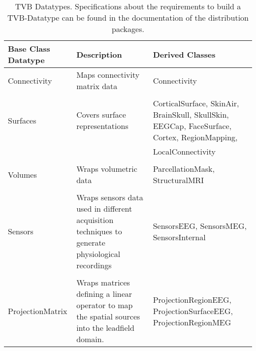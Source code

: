 \documentclass{bioinfo}
\begin{document}
\begin{methods}
\begin{center}     \begin{table*}[ht]\tiny     \label{tab:tvb_datatypes}
\caption{TVB Datatypes. Specifications about the requirements to build a
TVB-Datatype can be found in the documentation of the distribution packages.}
\begin{tabularx}{\textwidth}{lll}             \toprule             Base Class
Datatype & Description                   & Derived Classes \\
\midrule             Connectivity        & Maps connectivity matrix data     &
Connectivity\\             \\             Surfaces            & Covers surface
representations    &   CorticalSurface,
SkinAir,
BrainSkull,
SkullSkin,
EEGCap,
FaceSurface,
Cortex,
RegionMapping, \\
&&  LocalConnectivity\\             \\
Volumes             & Wraps volumetric data            & ParcellationMask,
StructuralMRI \\             \\
Sensors              & Wraps sensors data used in different acquisition
techniques to generate physiological recordings
& SensorsEEG, SensorsMEG, SensorsInternal\\             \\
ProjectionMatrix    & Wraps matrices defining a linear operator to map the
spatial sources into the leadfield domain.
&  ProjectionRegionEEG, ProjectionSurfaceEEG, ProjectionRegionMEG   \\
            

\end{tabularx}
\end{table*}
\end{center}
\end{methods}
\end{document}
